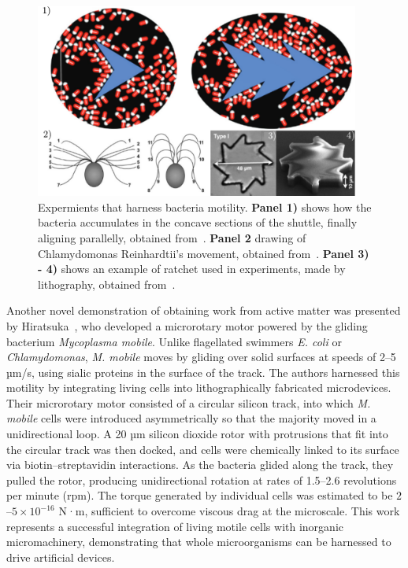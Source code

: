  \begin{figure}[h]
  \begin{center}
    \includegraphics[width=0.95\textwidth]{figures/harnessWork.pdf}
  \end{center}
  \caption[Experiments that harness bacteria motility.]{Expermients that harness bacteria motility. \textbf{Panel 1)} shows how the bacteria accumulates in the concave sections of the shuttle, finally aligning parallelly, obtained from~\cite{angelani2010geometrically}. \textbf{Panel 2} drawing of Chlamydomonas Reinhardtii's movement, obtained from~\cite{weibel2005microoxen}. \textbf{Panel 3) - 4)} shows an example of ratchet used in experiments, made by lithography, obtained from~\cite{di2010bacterial}.}\label{fig:harnesswork}
\end{figure}

Another novel demonstration of obtaining work from active matter was presented by Hiratsuka~\cite{hiratsuka2006microrotary}, who developed a microrotary motor powered by the gliding bacterium \textit{Mycoplasma mobile}. Unlike flagellated swimmers \textit{E. coli} or \textit{Chlamydomonas}, \textit{M. mobile} moves by gliding over solid surfaces at speeds of 2–5 µm/s, using sialic proteins in the surface of the track. The authors harnessed this motility by integrating living cells into lithographically fabricated microdevices.
Their microrotary motor consisted of a circular silicon track, into which \textit{M. mobile} cells were introduced asymmetrically so that the majority moved in a unidirectional loop. A 20 µm silicon dioxide rotor with protrusions that fit into the circular track was then docked, and cells were chemically linked to its surface via biotin–streptavidin interactions. As the bacteria glided along the track, they pulled the rotor, producing unidirectional rotation at rates of 1.5–2.6 revolutions per minute (rpm). The torque generated by individual cells was estimated to be $2$–$5\times10^{-16}$ N·m, sufficient to overcome viscous drag at the microscale.
This work represents a successful integration of living motile cells with inorganic micromachinery, demonstrating that whole microorganisms can be harnessed to drive artificial devices. 

